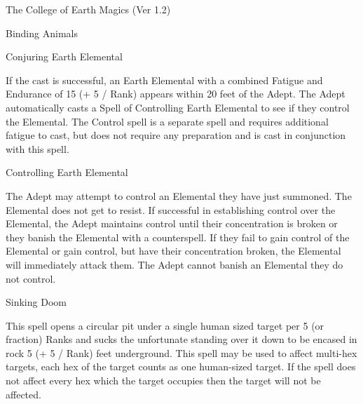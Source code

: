 \begin{Chapter}{The College of Earth Magics (Ver 1.2)}
\begin{spell}[S-9]{Binding Animals }
\begin{effects}
\end{effects}
\end{spell}

\begin{spell}[S-10]{Conjuring Earth Elemental }

\begin{effects}
If the cast is successful, an Earth Elemental with a combined Fatigue
and Endurance of 15 (+ 5 / Rank) appears within 20 feet of the Adept.
The Adept automatically casts a Spell of Controlling Earth Elemental
to see if they control the Elemental. The Control spell is a separate
spell and requires additional fatigue to cast, but does not require
any preparation and is cast in conjunction with this spell.

\end{effects}
\end{spell}

\begin{spell}[S-11]{Controlling Earth Elemental }

\begin{effects}
The Adept may attempt to control an Elemental they have just summoned.
The Elemental does not get to resist.  If successful in establishing
control over the Elemental, the Adept maintains control until their
concentration is broken or they banish the Elemental with a
counterspell.  If they fail to gain control of the Elemental or gain
control, but have their concentration broken, the Elemental will
immediately attack them.  The Adept cannot banish an Elemental they do
not control.

\end{effects}
\end{spell}

\begin{spell}[S-12]{Sinking Doom }

\begin{effects}
This spell opens a circular pit under a single human sized target per
5 (or fraction) Ranks and sucks the unfortunate standing over it down
to be encased in rock 5 (+ 5 / Rank) feet underground.  This spell may
be used to affect multi-hex targets, each hex of the target counts as
one human-sized target. If the spell does not affect every hex which
the target occupies then the target will not be affected.
\end{effects}
\end{spell}


\end{Chapter}
